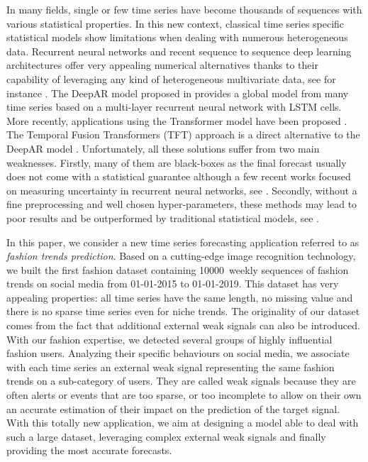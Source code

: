 \documentclass[review]{elsarticle}
\newcommand{\numberts}{10000}
\begin{document}
In many fields, single or few time series have become thousands of sequences with various statistical properties. In this new context, classical time series specific statistical models show limitations when dealing with numerous heterogeneous data. Recurrent neural networks and recent sequence to sequence deep learning architectures offer very appealing numerical alternatives thanks to their capability of leveraging any kind of heterogeneous multivariate data, see for instance \cite{ hochreiter1997long,vaswani2017attention, 8614252, li2019enhancing, lim2019temporal,salinas2020deepar}. The DeepAR model proposed in \cite{salinas2020deepar} provides a global model from many time series based on a multi-layer recurrent neural network with LSTM cells. More recently, applications using the Transformer model have been proposed  \cite{li2019enhancing}. The Temporal Fusion Transformers (TFT) approach is a direct alternative to the DeepAR model \cite{lim2019temporal}.  Unfortunately, all these solutions suffer from two main weaknesses. Firstly, many of them are black-boxes  as the final forecast usually does not come with a statistical guarantee  although a few recent works focused on measuring uncertainty in recurrent neural networks, see  \cite{martin2020monte}. Secondly, without a fine preprocessing and well chosen hyper-parameters, these methods may lead to poor results and be outperformed by traditional statistical models, see \cite{makridakis2018m4}.

In this paper, we consider a  new time series forecasting application referred to as {\em fashion trends prediction}. Based on a cutting-edge image recognition technology, we built the first fashion dataset containing \numberts\ weekly sequences  of fashion trends on social media  from 01-01-2015 to 01-01-2019. This dataset has very appealing properties:  all time series have the same length, no missing value and there is no sparse time series even for niche trends. The originality of our dataset comes from the fact that additional external weak signals can also be introduced. With our fashion expertise, we detected several groups of highly influential fashion users. Analyzing their specific behaviours on social media, we associate with each time series an external weak signal representing the same fashion trends on a sub-category of users. They are called weak signals because they are often alerts or events that are too sparse, or too incomplete to allow on their own an accurate estimation of their impact on the prediction of the target signal. With this totally new application, we aim at designing a model able to deal with such a large dataset, leveraging  complex external weak signals and finally providing the most accurate forecasts.
 
\end{document}
